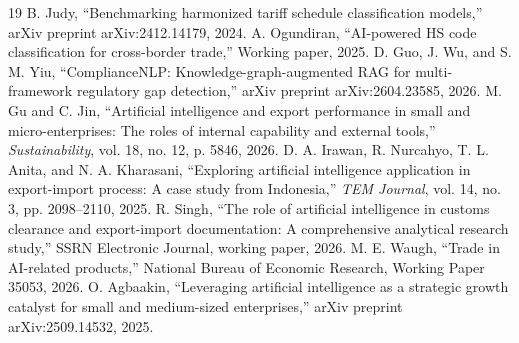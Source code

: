 \documentclass[conference]{IEEEtran}
\begin{document}
\begin{thebibliography}{19}
 B. Judy, ``Benchmarking harmonized tariff schedule classification models,'' arXiv preprint arXiv:2412.14179, 2024.
 A. Ogundiran, ``AI-powered HS code classification for cross-border trade,'' Working paper, 2025.
 D. Guo, J. Wu, and S. M. Yiu, ``ComplianceNLP: Knowledge-graph-augmented RAG for multi-framework regulatory gap detection,'' arXiv preprint arXiv:2604.23585, 2026.
 M. Gu and C. Jin, ``Artificial intelligence and export performance in small and micro-enterprises: The roles of internal capability and external tools,'' \emph{Sustainability}, vol. 18, no. 12, p. 5846, 2026.
 D. A. Irawan, R. Nurcahyo, T. L. Anita, and N. A. Kharasani, ``Exploring artificial intelligence application in export-import process: A case study from Indonesia,'' \emph{TEM Journal}, vol. 14, no. 3, pp. 2098--2110, 2025.
 R. Singh, ``The role of artificial intelligence in customs clearance and export-import documentation: A comprehensive analytical research study,'' SSRN Electronic Journal, working paper, 2026.
 M. E. Waugh, ``Trade in AI-related products,'' National Bureau of Economic Research, Working Paper 35053, 2026.
 O. Agbaakin, ``Leveraging artificial intelligence as a strategic growth catalyst for small and medium-sized enterprises,'' arXiv preprint arXiv:2509.14532, 2025.
\end{thebibliography}
\end{document}
